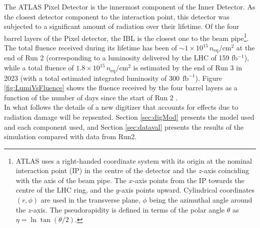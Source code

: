 The ATLAS \cite{Aad:2008zzm} Pixel Detector \cite{Aad:pixele} is the innermost component of the Inner Detector\cite{ATLAS:1997ag,ATLAS:1997af}.  As the closest detector component to the interaction point, this detector was subjected to a significant amount of radiation over their lifetime.
Of the four barrel layers of the Pixel detector, the IBL is the closest one to the beam pipe\footnote{ATLAS uses a right-handed coordinate system with its origin at the nominal interaction point (IP) in the centre of the detector and the $z$-axis coinciding with the axis of the beam pipe. The $x$-axis points from the IP towards the centre of the LHC ring, and the $y$-axis points upward. Cylindrical coordinates $(r, \phi)$ are used in the transverse plane, $\phi$  being the azimuthal angle around the $z$-axis. The pseudorapidity is defined in terms of the polar angle $\theta$ as $\eta = \ln \tan(\theta/2)$.}. The total fluence received during its lifetime has been of $\sim 1 \times 10^{15}\,  n_{\textrm{eq}}/\textrm{cm}^2$ at the end of Run 2 (corresponding to a luminosity delivered by the LHC of 159 fb$^{-1}$), while a total fluence of $1.8\times 10^{15}\,  n_{\textrm{eq}}/\textrm{cm}^2$ is estimated by the end of Run 3 in 2023 (with a total estimated integrated luminosity of $300~\ \textrm{fb}^{-1}$). Figure \ref{fig:LumiVsFluence} shows the fluence received by the four barrel layers as a function of the number of days since the start of Run 2 .\\
In what follows the details of a new digitizer that accounts for effects due to radiation damage will be 
repsented. Section \ref{sec:digMod} presents the model used and each component used, and Section \ref{sec:dataval} presents the results of the simulation compared with data from Run2.


